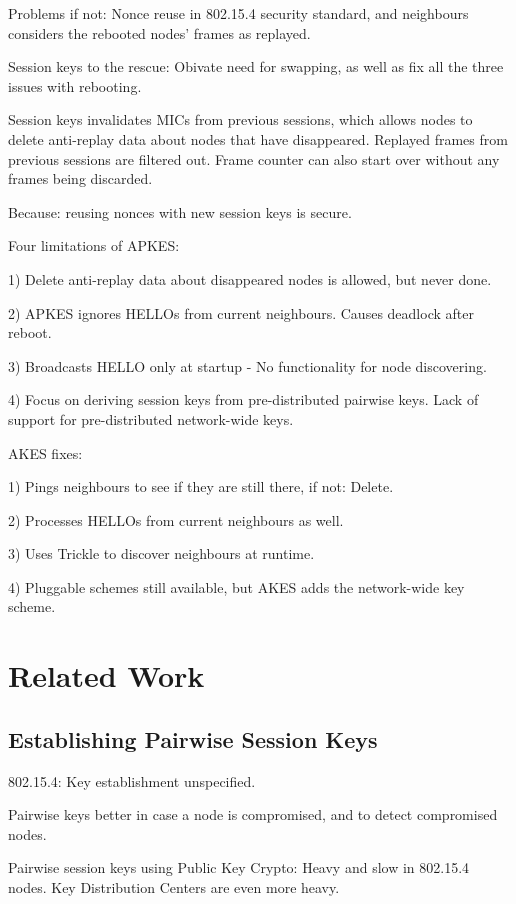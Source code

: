\documentclass[10pt]{article}
\begin{document}
Problems if not: Nonce reuse in 802.15.4 security standard, and neighbours considers the rebooted nodes' frames as replayed.

Session keys to the rescue: Obivate need for swapping, as well as fix all the three issues with rebooting.

Session keys invalidates MICs from previous sessions, which allows nodes to delete anti-replay data about nodes that have disappeared. Replayed frames from previous sessions are filtered out. Frame counter can also start over without any frames being discarded.

Because: reusing nonces with new session keys is secure.


Four limitations of APKES:

1) Delete anti-replay data about disappeared nodes is allowed, but never done.

2) APKES ignores HELLOs from current neighbours. Causes deadlock after reboot.

3) Broadcasts HELLO only at startup - No functionality for node discovering.

4) Focus on deriving session keys from pre-distributed pairwise keys. Lack of support for pre-distributed network-wide keys.


AKES fixes:

1) Pings neighbours to see if they are still there, if not: Delete.

2) Processes HELLOs from current neighbours as well.

3) Uses Trickle to discover neighbours at runtime.

4) Pluggable schemes still available, but AKES adds the network-wide key scheme.

\section{Related Work}

\subsection{Establishing Pairwise Session Keys}

802.15.4: Key establishment unspecified.

Pairwise keys better in case a node is compromised, and to detect compromised nodes.

Pairwise session keys using Public Key Crypto: Heavy and slow in 802.15.4 nodes. Key Distribution Centers are even more heavy.
\end{document}
